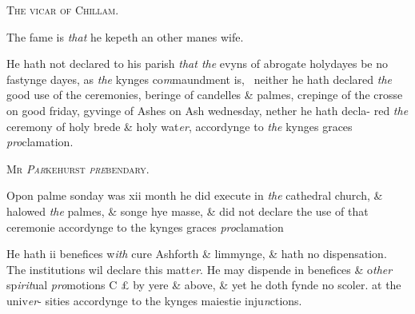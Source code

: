 \documentclass[12pt, a4paper]{book}
\begin{document}
	
				\begin{center} \begin{large} {\scshape The vicar of Chillam.} \end{large} \end{center}
			

 
			
		\ifthenelse{\isodd{\thepage}}
		{\reversemarginpar}
		{\normalmarginpar}
		The fame is \textit{that} he kepeth an other manes wife.
 
		\ifthenelse{\isodd{\thepage}}
		{\reversemarginpar}
		{\normalmarginpar}
		He hath not declared to his parish \textit{that the} evyns of abrogate
 holydayes be no fastynge dayes, as \textit{the} kynges co\textit{m}maundment is, 
 neither he hath declared \textit{the} good use of the ceremonies, beringe
 of candelles \& palmes, crepinge of the crosse on good friday,
 gyvinge of Ashes on Ash wednesday, nether he hath decla-
 red \textit{the} ceremony of holy brede \& holy wat\textit{er}, accordynge to
 \textit{the} kynges graces \textit{pro}clamation.
 

            
            	
				\begin{center} \begin{large} {\scshape Mr \textit{Par}kehurst \textit{pre}bendary.} \end{large} \end{center}
			

 
				\marginpar[\vspace{0.5cm}{\textcolor{Gray}{ceremonies}}]{}
			
		\ifthenelse{\isodd{\thepage}}
		{\reversemarginpar}
		{\normalmarginpar}
		Opon palme sonday was xii month he did execute in \textit{the}
 cathedral church, \& halowed \textit{the} palmes, \& songe hye masse,
 \& did not declare the use of that ceremonie accordynge to
 the kynges graces \textit{pro}clamation
            	
				\marginpar[\vspace{0.5cm}{\textcolor{Gray}{n}}]{}
			
		\ifthenelse{\isodd{\thepage}}
		{\reversemarginpar}
		{\normalmarginpar}
		He hath ii benefices w\textit{ith} cure Ashforth \& limmynge, \& hath no
 dispensation. The institutions wil declare this matt\textit{er}.
 He may dispende in benefices \& o\textit{ther} sp\textit{irit}ual\textit{ pro}motions C £ by
 yere \& above, \& yet he doth fynde no scoler. at the univ\textit{er}-
 sities accordynge to the kynges maiestie inju\textit{n}ctions.
  
\end{document}
